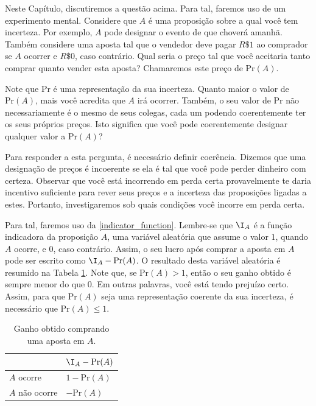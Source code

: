 Neste Capítulo, 
discutiremos a questão acima.
Para tal, faremos uso de um experimento mental.
Considere que $A$ é uma proposição 
sobre a qual você tem incerteza.
Por exemplo, $A$ pode designar o
evento de que choverá amanhã.
Também considere uma aposta tal que 
o vendedor deve pagar $R\$1$ ao comprador se $A$ ocorrer e
$R\$0$, caso contrário.
Qual seria o preço tal que você aceitaria
tanto comprar quanto vender esta aposta?
Chamaremos este preço de $\text{Pr}(A)$.

Note que $\text{Pr}$ é uma representação da sua incerteza.
Quanto maior o valor de $\text{Pr}(A)$,
mais você acredita que $A$ irá ocorrer.
Também, o seu valor de $\text{Pr}$ não necessariamente
é o mesmo de seus colegas, 
cada um podendo coerentemente ter os seus próprios preços.
Isto significa que você pode coerentemente designar
qualquer valor a $\text{Pr}(A)$?

Para responder a esta pergunta,
é necessário definir coerência.
Dizemos que uma designação de preços é
incoerente se ela é tal que você pode
perder dinheiro com certeza.
Observar que você está incorrendo em perda certa
provavelmente te daria incentivo suficiente
para rever seus preços e a incerteza
das proposições ligadas a estes.
Portanto, investigaremos sob quais condições 
você incorre em perda certa.

Para tal, faremos uso da \cref{indicator_function}.
Lembre-se que $\I_{A}$ é a função indicadora
da proposição $A$, 
uma variável aleatória que assume o valor
$1$, quando $A$ ocorre, e $0$, caso contrário.
Assim, o seu lucro após comprar a aposta em $A$
pode ser escrito como $\I_{A}-\text{Pr}(A)$.
O resultado desta variável aleatória é resumido
na Tabela \ref{table:aposta_comprar}.
Note que, se $\text{Pr}(A) > 1$,
então o seu ganho obtido é sempre menor do que $0$.
Em outras palavras, você está tendo prejuízo certo.
Assim, para que $\text{Pr}(A)$ 
seja uma representação coerente da sua incerteza,
é necessário que $\text{Pr}(A) \leq 1$.

\begin{table}
 \centering
 \begin{tabular}{|l|l|}
  \hline
  & $\I_{A}-\text{Pr}(A)$ \\
  \hline
  $A$ ocorre & $1-\text{Pr}(A)$ \\
  $A$ não ocorre & $-\text{Pr}(A)$ \\
  \hline
 \end{tabular}
 \caption{Ganho obtido comprando uma aposta em $A$.}
 \label{table:aposta_comprar}
\end{table}

